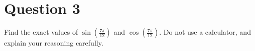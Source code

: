 \chapter{Question 3}
Find the exact values of $\sin(\frac{7\pi}{12})$ and $\cos(\frac{7\pi}{12})$.
Do not use a calculator, and explain your reasoning carefully.

